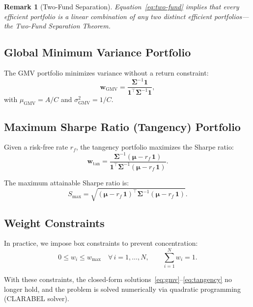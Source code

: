 \documentclass[12pt,a4paper]{article}
\newtheorem{remark}{Remark}[section]
\begin{document}
\begin{remark}[Two-Fund Separation]
Equation~\eqref{eq:two-fund} implies that every efficient portfolio is a linear combination of any two distinct efficient portfolios---the Two-Fund Separation Theorem.
\end{remark}

\subsection{Global Minimum Variance Portfolio}

The GMV portfolio minimizes variance without a return constraint:
\begin{equation}
    \bm{w}_{\text{GMV}} = \frac{\bm{\Sigma}^{-1}\bm{1}}{\bm{1}^\top\bm{\Sigma}^{-1}\bm{1}},
    \label{eq:gmv}
\end{equation}
with $\mu_{\text{GMV}} = A/C$ and $\sigma_{\text{GMV}}^2 = 1/C$.

\subsection{Maximum Sharpe Ratio (Tangency) Portfolio}

Given a risk-free rate $r_f$, the tangency portfolio maximizes the Sharpe ratio:
\begin{equation}
    \bm{w}_{\text{tan}} = \frac{\bm{\Sigma}^{-1}(\bm{\mu} - r_f\,\bm{1})}
                               {\bm{1}^\top\bm{\Sigma}^{-1}(\bm{\mu} - r_f\,\bm{1})}.
    \label{eq:tangency}
\end{equation}

The maximum attainable Sharpe ratio is:
\begin{equation}
    S_{\max} = \sqrt{(\bm{\mu} - r_f\,\bm{1})^\top \bm{\Sigma}^{-1} (\bm{\mu} - r_f\,\bm{1})}.
\end{equation}

\subsection{Weight Constraints}

In practice, we impose box constraints to prevent concentration:
\begin{equation}
    0 \leq w_i \leq w_{\max} \quad \forall\, i = 1, \ldots, N, \qquad
    \sum_{i=1}^{N} w_i = 1.
    \label{eq:box-constraints}
\end{equation}

With these constraints, the closed-form solutions~\eqref{eq:gmv}--\eqref{eq:tangency} no longer hold, and the problem is solved numerically via quadratic programming (CLARABEL solver).
\end{document}
